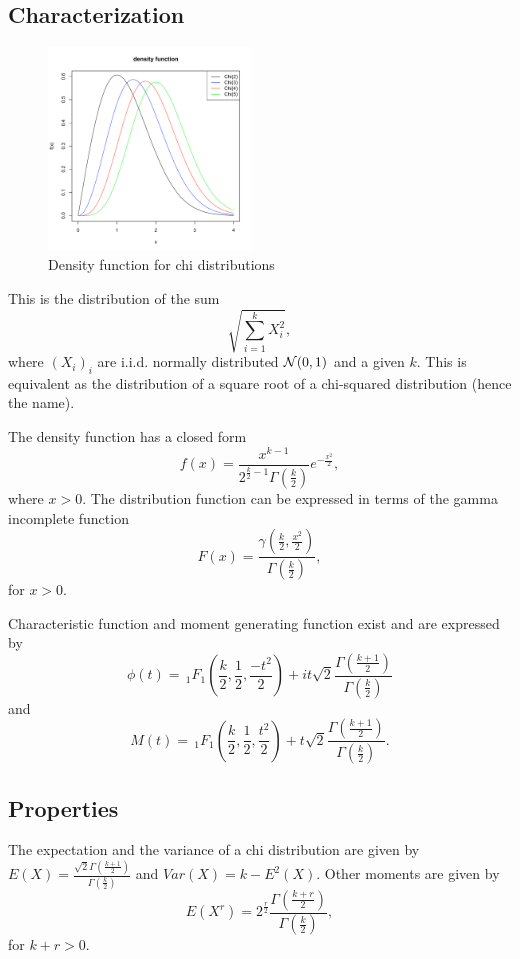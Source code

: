 \subsection{Characterization}
\begin{figure}
  \vspace{-20pt}
  \begin{center}
    \includegraphics[width=0.48\textwidth]{img/chizoom}
  \end{center}
  \vspace{-20pt}  
  \caption{Density function for chi distributions}
\end{figure}
This is the distribution of the sum
$$
\sqrt{\sum_{i=1}^k X_i^2},
$$
where $(X_i)_i$ are i.i.d. normally distributed $\mathcal N(0,1)$ and a given $k$. This is equivalent as the distribution of a square root of a chi-squared distribution (hence the name). 

The density function has a closed form
$$
f(x) = \frac{x^{k-1}}{2^{\frac{k}{2}-1}\Gamma\left(\frac{k}{2}\right)} e^{-\frac{x^2}{2}},
$$
where $x>0$.
The distribution function can be expressed in terms of the gamma incomplete function
$$
F(x) = \frac{\gamma(\frac{k}{2}, \frac{x^2}{2})}{\Gamma\left(\frac{k}{2}\right)},
$$
for $x>0$. 

Characteristic function and moment generating function exist and are expressed by
$$
\phi(t) = {\,}_1F_1\left(\frac{k}{2},\frac{1}{2},\frac{-t^2}{2}\right)+it\sqrt{2}\frac{\Gamma\left(\frac{k+1}{2}\right)}{\Gamma\left(\frac{k}{2}\right)} 
$$
and
$$
M(t) = {\,}_1F_1\left(\frac{k}{2},\frac{1}{2},\frac{t^2}{2}\right) +t\sqrt{2}\frac{\Gamma\left(\frac{k+1}{2}\right)}{\Gamma\left(\frac{k}{2}\right)}.
$$


\subsection{Properties}
The expectation and the variance of a chi distribution are given by $E(X) =\frac{\sqrt{2} \Gamma(\frac{k+1}{2})}{ \Gamma(\frac{k}{2})} $ and $Var(X) = k-E^2(X)$. Other moments are given by
$$
E(X^r) = 2^{\frac{r}{2}}\frac{ \Gamma(\frac{k+r}{2})}{ \Gamma(\frac{k}{2})},
$$
for $k+r>0$.

